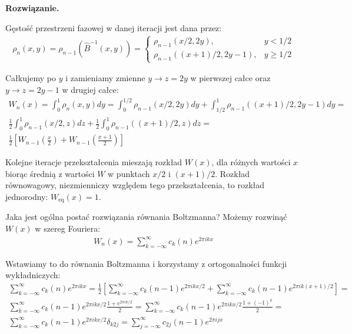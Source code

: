 \documentclass[11pt,a4paper]{article}
\newenvironment{solution}{\vspace{1cm} \par\textbf{Rozwiązanie.} \vspace{1cm}}{}
\begin{document}
\begin{solution}

Gęstość przestrzeni fazowej w danej iteracji jest dana przez:
\begin{align*}
\rho_n(x, y) = \rho_{n-1}(\hat{B}^{-1}(x, y)) =
 \begin{cases} \rho_{n-1}(x/2, 2y), & y < 1/2 \\ \rho_{n-1}((x+1)/2, 2y - 1), & y \geq 1/2 \end{cases}
\end{align*} 

Całkujemy po $y$ i zamieniamy zmienne $y \to z = 2y$ w pierwszej całce 
oraz $y \to z = 2y - 1$ w drugiej całce:
\begin{align*}
W_n(x) = \int_0^1 \rho_n(x, y) dy = \int_0^{1/2} \rho_{n-1}(x/2, 2y) dy + \int_{1/2}^1 \rho_{n-1}((x+1)/2, 2y - 1) dy = \\
\frac{1}{2}\int_0^1 \rho_{n-1}(x/2, z) dz + \frac{1}{2}\int_0^1 \rho_{n-1}((x+1)/2, z) dz = \\
\frac{1}{2}\left[W_{n-1}\left(\frac{x}{2}\right) + W_{n-1}\left(\frac{x+1}{2}\right)\right]
\end{align*}

Kolejne iteracje przekształcenia mieszają rozkład $W(x)$, dla różnych
wartości $x$ biorąc średnią z wartości $W$ w punktach $x/2$ i $(x+1)/2$. 
Rozkład równowagowy, niezmienniczy względem tego
przekształcenia, to rozkład jednorodny: $W_{\text{eq}}(x) = 1$.

Jaka jest ogólna postać rozwiązania równania Boltzmanna? Możemy rozwinąć $W(x)$ 
w szereg Fouriera:
\begin{align*}
W_{n}(x) = \sum_{k=-\infty}^{\infty} c_k(n) e^{2\pi i k x}
\end{align*}

Wstawiamy to do równania Boltzmanna i korzystamy z ortogonalności funkcji wykładniczych:
\begin{align*}
\sum_{k=-\infty}^{\infty} c_k(n) e^{2\pi i k x} = \frac{1}{2}\left[ \sum_{k=-\infty}^{\infty} c_k(n-1) e^{2\pi i k x/2} + \sum_{k=-\infty}^{\infty} c_k(n-1) e^{2\pi i k (x+1)/2} \right] = \\
\sum_{k=-\infty}^{\infty} c_k(n-1) e^{2\pi i k x/2} \frac{1 + e^{2\pi i k / 2}}{2} = 
\sum_{k=-\infty}^{\infty} c_k(n-1) e^{2\pi i k x/2} \frac{1 + (-1)^k}{2} = \\
\sum_{k=-\infty}^{\infty} c_k(n-1) e^{2\pi i k x/2} \delta_{k 2j} = 
\sum_{j=-\infty}^{\infty} c_{2j}(n-1) e^{2\pi i j x}
\end{align*}


\end{solution}
\end{document}
